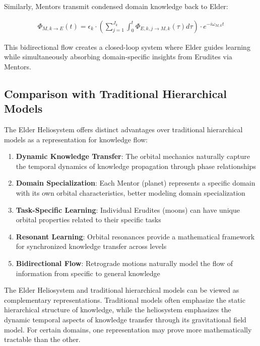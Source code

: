 Similarly, Mentors transmit condensed domain knowledge back to Elder:

\begin{align}
\Phi_{M,k \rightarrow E}(t) = \epsilon_k \cdot \left(\sum_{j=1}^{J_k} \int_0^t \Phi_{E,k,j \rightarrow M,k}(\tau) d\tau\right) \cdot e^{-i\omega_{M,k}t}
\end{align}

This bidirectional flow creates a closed-loop system where Elder guides learning while simultaneously absorbing domain-specific insights from Erudites via Mentors.

\subsection{Comparison with Traditional Hierarchical Models}

The Elder Heliosystem offers distinct advantages over traditional hierarchical models as a representation for knowledge flow:

\begin{enumerate}
    \item \textbf{Dynamic Knowledge Transfer}: The orbital mechanics naturally capture the temporal dynamics of knowledge propagation through phase relationships
    \item \textbf{Domain Specialization}: Each Mentor (planet) represents a specific domain with its own orbital characteristics, better modeling domain specialization
    \item \textbf{Task-Specific Learning}: Individual Erudites (moons) can have unique orbital properties related to their specific tasks
    \item \textbf{Resonant Learning}: Orbital resonances provide a mathematical framework for synchronized knowledge transfer across levels
    \item \textbf{Bidirectional Flow}: Retrograde motions naturally model the flow of information from specific to general knowledge
\end{enumerate}

\begin{remark}
The Elder Heliosystem and traditional hierarchical models can be viewed as complementary representations. Traditional models often emphasize the static hierarchical structure of knowledge, while the heliosystem emphasizes the dynamic temporal aspects of knowledge transfer through its gravitational field model. For certain domains, one representation may prove more mathematically tractable than the other.
\end{remark}

